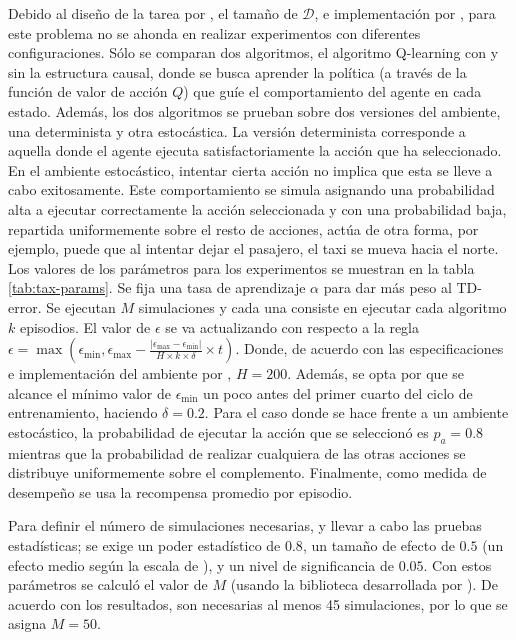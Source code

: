 Debido al diseño de la tarea por \citet{Dietterich:2000:HRL:1622262.1622268}, el tamaño de $\mathcal{D}$, e 
implementación por \citet{gym2016brockman},
para este problema no se ahonda en realizar experimentos con diferentes configuraciones.
Sólo se comparan dos algoritmos,
el algoritmo Q-learning con y sin la estructura causal, donde
se busca aprender la política (a través de la función de valor de acción $Q$) que guíe el comportamiento del agente
en cada estado.
Además, los dos algoritmos se prueban sobre dos versiones del ambiente, una determinista
y otra estocástica. 
La versión determinista corresponde a aquella donde
el agente ejecuta satisfactoriamente la acción que ha seleccionado. 
En el ambiente estocástico, intentar cierta acción no implica 
que esta se lleve a cabo exitosamente. Este comportamiento
se simula asignando una probabilidad alta a ejecutar correctamente
la acción seleccionada y 
con una probabilidad baja, repartida uniformemente sobre el
resto de acciones, actúa de otra forma, por ejemplo,
puede que al intentar dejar el pasajero, el taxi se mueva
hacia el norte.
Los valores de los parámetros para los experimentos se muestran en la tabla \ref{tab:tax-params}. Se fija una tasa de aprendizaje $\alpha$ para dar más peso al TD-error. Se ejecutan $M$ simulaciones y cada una consiste en ejecutar cada algoritmo $k$  episodios.  El valor de $\epsilon$  se va actualizando con respecto a la regla $\epsilon = \max(\epsilon_{\min}, \epsilon_{\max} - \frac{|\epsilon_{\max} - \epsilon_{\min}|}{H \times k \times \delta} \times t)$. Donde, de acuerdo con las especificaciones e implementación del ambiente por \citet{gym2016brockman}, $H = 200$. Además, se opta por que se alcance el mínimo valor de $\epsilon_{\min}$ un poco antes del primer cuarto del ciclo de entrenamiento, haciendo $\delta = 0.2$. Para el caso donde se hace frente a un ambiente estocástico, la probabilidad de ejecutar la acción que se seleccionó es $p_a = 0.8$ mientras que la probabilidad de realizar cualquiera de las otras acciones se distribuye uniformemente sobre el complemento. Finalmente, como medida
de desempeño se usa la recompensa promedio por episodio.

Para definir el número de simulaciones necesarias, y llevar a cabo las pruebas 
estadísticas; se exige un poder estadístico
de $0.8$, un tamaño de efecto de $0.5$ (un efecto medio según la escala
de \citet{cohen2013statistical}), y un nivel de significancia de $0.05$. Con estos parámetros se calculó el valor de $M$ (usando la biblioteca desarrollada por \citet{seabold2010statsmodels}). De acuerdo con los resultados, son necesarias al menos 45 simulaciones, por lo que se asigna $M = 50$. 

